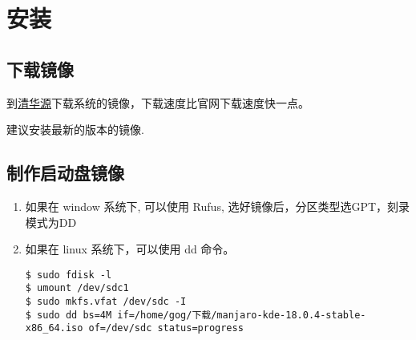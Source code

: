 \section{安装}
\subsection{下载镜像}
到\href{https://mirrors.tuna.tsinghua.edu.cn/deepin-cd/}{清华源}下载系统的镜像，下载速度比官网下载速度快一点。

建议安装最新的版本的镜像.
\subsection{制作启动盘镜像}
\flushleft
\begin{enumerate}
\item 如果在 window 系统下, 可以使用 Rufus, 选好镜像后，分区类型选GPT，刻录模式为DD
\item 如果在 linux 系统下，可以使用 dd 命令。
\begin{lstlisting}
$ sudo fdisk -l 
$ umount /dev/sdc1
$ sudo mkfs.vfat /dev/sdc -I
$ sudo dd bs=4M if=/home/gog/下载/manjaro-kde-18.0.4-stable-x86_64.iso of=/dev/sdc status=progress
\end{lstlisting}

\end{enumerate}